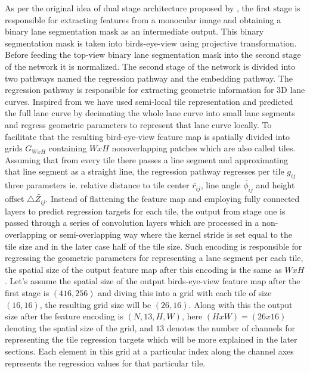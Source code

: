      As per the original idea of dual stage architecture proposed by \cite{guo2020gen}, the first stage is responsible for extracting features from a monocular image and obtaining a binary lane segmentation mask as an intermediate output. This binary segmentation mask is taken into birds-eye-view using projective transformation. Before feeding the top-view binary lane segmentation mask into the second stage of the network it is normalized. The second stage of the network is divided into two pathways named the regression pathway and the embedding pathway. The regression pathway is responsible for extracting geometric information for 3D lane curves. Inspired from \cite{DBLP:journals/corr/abs-2011-01535} we have used semi-local tile representation and predicted the full lane curve by decimating the whole lane curve into small lane segments and regress geometric parameters to represent that lane curve locally. To facilitate that the resulting bird-eye-view feature map is spatially divided into grids $G_{WxH}$ containing $WxH$ nonoverlapping patches which are also called tiles. Assuming that from every tile there passes a line segment and approximating that line segment as a straight line, the regression pathway regresses per tile $g_{ij}$ three parameters ie. relative distance to tile center $\widetilde{r_{ij}}$, line angle $\widetilde{\phi_{ij}}$ and height offset $\triangle \widetilde{Z_{ij}}$. Instead of flattening the feature map and employing fully connected layers to predict regression targets for each tile, the output from stage one is passed through a series of convolution layers which are processed in a non-overlapping or semi-overlapping way where the kernel stride is set equal to the tile size and in the later case half of the tile size. Such encoding is responsible for regressing the geometric parameters for representing a lane segment per each tile, the spatial size of the output feature map after this encoding is the same as $WxH$. Let's assume the spatial size of the output birds-eye-view feature map after the first stage is $(416,256)$ and diving this into a grid with each tile of size $(16,16)$, the resulting grid size will be $(26,16)$. Along with this the output size after the feature encoding is $(N, 13, H, W)$, here $(HxW) = (26x16)$ denoting the spatial size of the grid, and $13$ denotes the number of channels for representing the tile regression targets which will be more explained in the later sections. Each element in this grid at a particular index along the channel axes represents the regression values for that particular tile.
     
